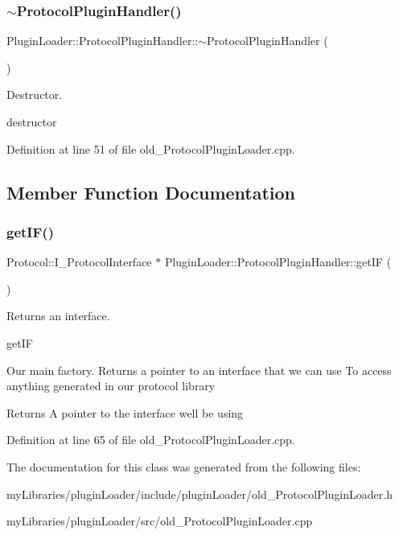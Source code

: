 \subsubsection{\texorpdfstring{$\sim$ProtocolPluginHandler()}{~ProtocolPluginHandler()}}
{\footnotesize\ttfamily Plugin\+Loader\+::\+Protocol\+Plugin\+Handler\+::$\sim$\+Protocol\+Plugin\+Handler (\begin{DoxyParamCaption}{ }\end{DoxyParamCaption})}



Destructor. 

destructor 

Definition at line 51 of file old\+\_\+\+Protocol\+Plugin\+Loader.\+cpp.



\subsection{Member Function Documentation}
\mbox{\label{classPluginLoader_1_1ProtocolPluginHandler_a446375f1d651a8eb6c708c05a03dc9db}} 
\subsubsection{\texorpdfstring{getIF()}{getIF()}}
{\footnotesize\ttfamily Protocol\+::\+I\+\_\+\+Protocol\+Interface $\ast$ Plugin\+Loader\+::\+Protocol\+Plugin\+Handler\+::get\+IF (\begin{DoxyParamCaption}{ }\end{DoxyParamCaption})}



Returns an interface. 

get\+IF

Our main factory. Returns a pointer to an interface that we can use To access anything generated in our protocol library

\begin{DoxyReturn}{Returns}
A pointer to the interface we\textquotesingle{}ll be using 
\end{DoxyReturn}


Definition at line 65 of file old\+\_\+\+Protocol\+Plugin\+Loader.\+cpp.



The documentation for this class was generated from the following files\+:\begin{DoxyCompactItemize}
\item 
my\+Libraries/plugin\+Loader/include/plugin\+Loader/old\+\_\+\+Protocol\+Plugin\+Loader.\+h\item 
my\+Libraries/plugin\+Loader/src/old\+\_\+\+Protocol\+Plugin\+Loader.\+cpp\end{DoxyCompactItemize}
